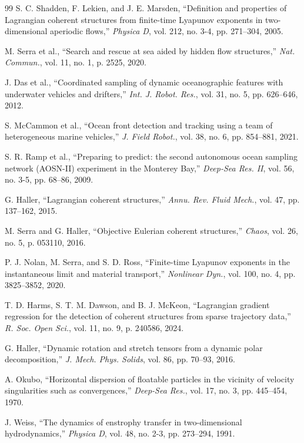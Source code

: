 \documentclass[lettersize,journal]{IEEEtran}
\begin{document}
\begin{thebibliography}{99}
 S. C. Shadden, F. Lekien, and J. E. Marsden, ``Definition and
properties of Lagrangian coherent structures from finite-time Lyapunov
exponents in two-dimensional aperiodic flows,'' \textit{Physica D}, vol. 212,
no. 3-4, pp. 271--304, 2005.

 M. Serra et al., ``Search and rescue at sea aided by hidden flow
structures,'' \textit{Nat. Commun.}, vol. 11, no. 1, p. 2525, 2020.

 J. Das et al., ``Coordinated sampling of dynamic oceanographic
features with underwater vehicles and drifters,'' \textit{Int. J. Robot.
Res.}, vol. 31, no. 5, pp. 626--646, 2012.

 S. McCammon et al., ``Ocean front detection and tracking using a
team of heterogeneous marine vehicles,'' \textit{J. Field Robot.}, vol. 38,
no. 6, pp. 854--881, 2021.

 S. R. Ramp et al., ``Preparing to predict: the second autonomous
ocean sampling network (AOSN-II) experiment in the Monterey Bay,''
\textit{Deep-Sea Res. II}, vol. 56, no. 3-5, pp. 68--86, 2009.

 G. Haller, ``Lagrangian coherent structures,'' \textit{Annu. Rev.
Fluid Mech.}, vol. 47, pp. 137--162, 2015.

 M. Serra and G. Haller, ``Objective Eulerian coherent
structures,'' \textit{Chaos}, vol. 26, no. 5, p. 053110, 2016.

 P. J. Nolan, M. Serra, and S. D. Ross, ``Finite-time Lyapunov
exponents in the instantaneous limit and material transport,''
\textit{Nonlinear Dyn.}, vol. 100, no. 4, pp. 3825--3852, 2020.

 T. D. Harms, S. T. M. Dawson, and B. J. McKeon, ``Lagrangian
gradient regression for the detection of coherent structures from sparse
trajectory data,'' \textit{R. Soc. Open Sci.}, vol. 11, no. 9,
p. 240586, 2024.

 G. Haller, ``Dynamic rotation and stretch tensors from a
dynamic polar decomposition,'' \textit{J. Mech. Phys. Solids}, vol. 86,
pp. 70--93, 2016.

 A. Okubo, ``Horizontal dispersion of floatable particles in the
vicinity of velocity singularities such as convergences,'' \textit{Deep-Sea
Res.}, vol. 17, no. 3, pp. 445--454, 1970.

 J. Weiss, ``The dynamics of enstrophy transfer in two-dimensional
hydrodynamics,'' \textit{Physica D}, vol. 48, no. 2-3, pp. 273--294, 1991.


\end{thebibliography}
\end{document}
